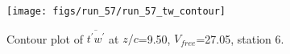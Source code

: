 \begin{figure}[H]
\centering
\texttt{[image: figs/run\_57/run\_57\_tw\_contour]}
\caption{Contour plot of $\overline{t^\prime w^\prime}$ at $z/c$=9.50, $V_{free}$=27.05, station 6.}
\label{fig:run_57_tw_contour}
\end{figure}


